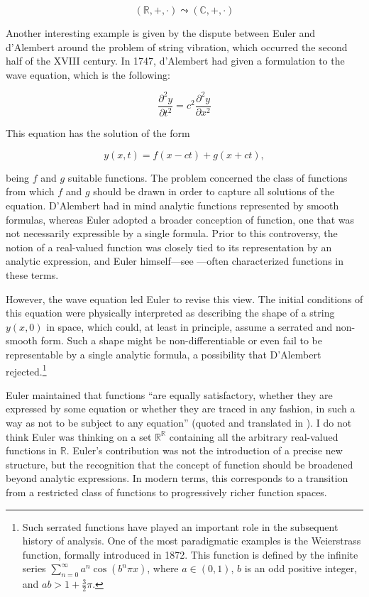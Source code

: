 \documentclass[11pt,a4paper]{article}
\begin{document}
$$ (\mathbb{R}, +, \cdot) \leadsto (\mathbb{C}, +, \cdot) $$


Another interesting example is given by the dispute between Euler and d'Alembert around the problem of string vibration, which occurred the second half of the XVIII century. In 1747, d'Alembert had given a formulation to the wave equation, which is the following:

\[
\frac{\partial^2 y}{\partial t^2}
=
c^2 \frac{\partial^2 y}{\partial x^2}
\]

This equation has the solution of the form

\[
y(x,t) = f(x-ct) + g(x+ct),
\]

being \(f\) and \(g\) suitable functions. The problem concerned the class of functions from which \(f\) and \(g\) should be drawn in order to capture all solutions of the equation. D'Alembert had in mind analytic functions represented by smooth formulas, whereas Euler adopted a broader conception of function, one that was not necessarily expressible by a single formula. Prior to this controversy, the notion of a real-valued function was closely tied to its representation by an analytic expression, and Euler himself---see \textcite[p.~117]{Maddy1997}---often characterized functions in these terms.

However, the wave equation led Euler to revise this view. The initial conditions of this equation were physically interpreted as describing the shape of a string \(y(x,0)\) in space, which could, at least in principle, assume a serrated and non-smooth form. Such a shape might be non-differentiable or even fail to be representable by a single analytic formula, a possibility that D'Alembert rejected.\footnote{Such serrated functions have played an important role in the subsequent history of analysis. One of the most paradigmatic examples is the Weierstrass function, formally introduced in 1872. This function is defined by the infinite series \(\sum_{n=0}^{\infty} a^n \cos(b^n \pi x)\), where \(a \in (0,1)\), \(b\) is an odd positive integer, and \(ab > 1 + \frac{3}{2}\pi\).}

Euler maintained that functions ``are equally satisfactory, whether they are expressed by some equation or whether they are traced in any fashion, in such a way as not to be subject to any equation'' (quoted and translated in \textcite[p.~288]{Truesdell1960}). I do not think Euler was thinking on a set $\mathbb{R}^\mathbb{R}$ containing all the arbitrary real-valued functions in $\mathbb{R}$. Euler's contribution was not the introduction of a precise new structure, but the recognition that the concept of function should be broadened beyond analytic expressions. In modern terms, this corresponds to a transition from a restricted class of functions to progressively richer function spaces.
\end{document}
